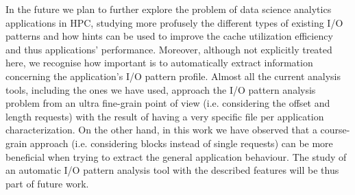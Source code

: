 In the future we plan to further explore the problem of data science analytics applications in HPC, studying more profusely the different types of existing I/O patterns and how hints can be used to improve the cache utilization efficiency and thus applications' performance. Moreover, although not explicitly treated here, we recognise how important is to automatically extract information concerning the application's I/O pattern profile. Almost all the current analysis tools, including the ones we have used, approach the I/O pattern analysis problem from an ultra fine-grain point of view (i.e. considering the offset and length requests) with the result of having a very specific file per application characterization. On the other hand, in this work we have observed that a course-grain approach (i.e. considering blocks instead of single requests) can be more beneficial when trying to extract the general application behaviour. The study of an automatic I/O pattern analysis tool with the described features will be thus part of future work. 


